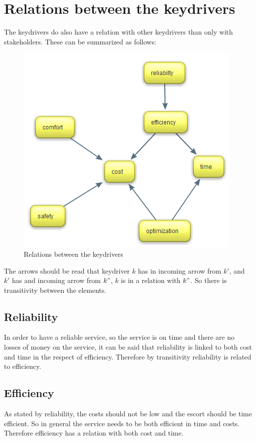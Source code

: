 \documentclass[a4paper, 11pt, notitlepage]{report}
\begin{document}
\section{Relations between the keydrivers}
The keydrivers do also have a relation with other keydrivers than only with stakeholders. These can be summarized as follows:
\begin{center}
\begin{figure}[!h]
	\caption{Relations between the keydrivers}
	\includegraphics[scale=0.45]{figures/relationkeydrivers.jpg}
\end{figure}
\end{center}
The arrows should be read that keydriver $k$ has in incoming arrow from $k'$, and $k'$ has and incoming arrow from $k"$, $k$ is in a relation with $k"$. So there is transitivity between the elements.
\subsection{Reliability}
In order to have a reliable service, so the service is on time and there are no losses of money on the service, it can be said that reliability is linked to both cost and time in the respect of efficiency. Therefore by transitivity reliability is related to efficiency.
\subsection{Efficiency}
As stated by reliability, the costs should not be low and the escort should be time efficient. So in general the service needs to be both efficient in time and costs. Therefore efficiency has a relation with both cost and time.
\end{document}
